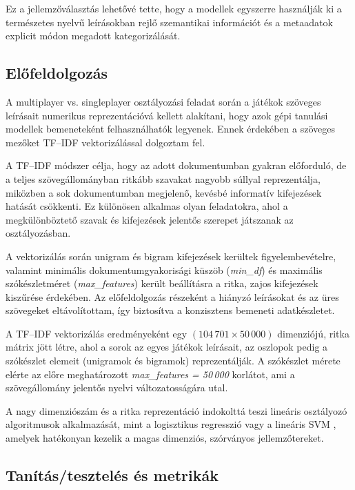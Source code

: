 Ez a jellemzőválasztás lehetővé tette,
hogy a modellek egyszerre használják ki
a természetes nyelvű leírásokban rejlő szemantikai információt
és a metaadatok explicit módon megadott kategorizálását.

\subsection{Előfeldolgozás}

A multiplayer vs. singleplayer osztályozási feladat során
a játékok szöveges leírásait numerikus reprezentációvá kellett alakítani,
hogy azok gépi tanulási modellek bemeneteként felhasználhatók legyenek.
Ennek érdekében a szöveges mezőket
TF--IDF vektorizálással
dolgoztam fel.

A TF--IDF módszer célja,
hogy az adott dokumentumban gyakran előforduló,
de a teljes szövegállományban ritkább szavakat nagyobb súllyal reprezentálja,
miközben a sok dokumentumban megjelenő,
kevésbé informatív kifejezések hatását csökkenti.
Ez különösen alkalmas olyan feladatokra,
ahol a megkülönböztető szavak és kifejezések
jelentős szerepet játszanak az osztályozásban.

A vektorizálás során
unigram és bigram kifejezések kerültek figyelembevételre,
valamint minimális dokumentumgyakorisági küszöb
(\textit{min\_df}) és maximális szókészletméret
(\textit{max\_features}) került beállításra
a ritka, zajos kifejezések kiszűrése érdekében.
Az előfeldolgozás részeként
a hiányzó leírásokat és az üres szövegeket eltávolítottam,
így biztosítva a konzisztens bemeneti adatkészletet.

A TF--IDF vektorizálás eredményeként
egy $(104\,701 \times 50\,000)$ dimenziójú,
ritka mátrix jött létre,
ahol a sorok az egyes játékok leírásait,
az oszlopok pedig a szókészlet elemeit
(unigramok és bigramok) reprezentálják.
A szókészlet mérete elérte az előre meghatározott
\textit{max\_features = 50\,000} korlátot,
ami a szövegállomány jelentős nyelvi változatosságára utal.

A nagy dimenziószám és a ritka reprezentáció
indokolttá teszi lineáris osztályozó algoritmusok alkalmazását,
mint a logisztikus regresszió \cite{logistic regression} vagy a lineáris SVM  \cite{svm},
amelyek hatékonyan kezelik a magas dimenziós,
szórványos jellemzőtereket.

\subsection{Tanítás/tesztelés és metrikák}


